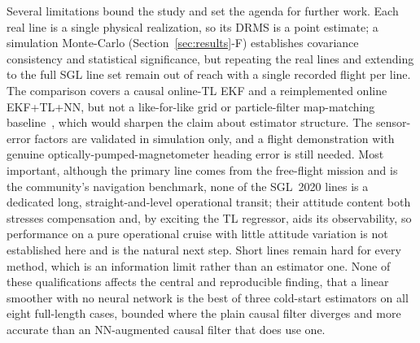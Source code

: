 \documentclass{IEEEtaes}
\begin{document}
Several limitations bound the study and set the agenda for further work. Each real
line is a single physical realization, so its DRMS is a point estimate; a simulation
Monte-Carlo (Section~\ref{sec:results}-F) establishes covariance consistency and
statistical significance, but repeating the real lines and extending to the full SGL
line set remain out of reach with a single recorded flight per line. The comparison
covers a causal online-TL EKF and a reimplemented online EKF+TL+NN, but not a
like-for-like grid or particle-filter map-matching
baseline~\cite{bergman1999,nordlund2009}, which would sharpen the claim about
estimator structure. The sensor-error factors are validated in simulation only, and
a flight demonstration with genuine optically-pumped-magnetometer heading error is
still needed. Most important, although the primary line comes from the free-flight
mission and is the community's navigation benchmark, none of the SGL~2020 lines is a
dedicated long, straight-and-level operational transit; their attitude content both
stresses compensation and, by exciting the TL regressor, aids its observability, so
performance on a pure operational cruise with little attitude variation is not
established here and is the natural next step. Short lines remain hard for every
method, which is an information limit rather than an estimator one. None of these
qualifications affects the central and reproducible finding, that a linear smoother
with no neural network is the best of three cold-start estimators on all eight
full-length cases, bounded where the plain causal filter diverges and more accurate
than an NN-augmented causal filter that does use one.

\appendices
\end{document}
